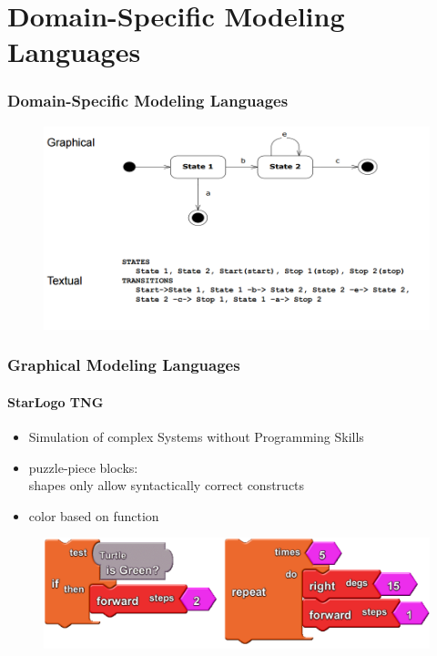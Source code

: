 \documentclass[11 pt,t]{beamer}
\begin{document}
\section{Domain-Specific Modeling Languages}

\begin{frame}
\vspace{.5cm}
  \frametitle{Domain-Specific Modeling Languages}
    \begin{figure}[H]
      \centering
      \includegraphics[width=\textwidth]{images/GraficalTextualComparison.PNG}
      \label{compare:textgraphiclang}
    \end{figure}
\end{frame}


\begin{frame}
\vspace{.5cm}
  \frametitle{Graphical Modeling Languages}
  \framesubtitle{StarLogo TNG}
  \begin{itemize}
   \item Simulation of complex Systems without Programming Skills
   \item puzzle-piece blocks: 
	\\shapes only allow syntactically correct constructs
   \item color based on function
  \end{itemize}
  
  \begin{figure}[hbtp]
	\centering
  \includegraphics[width=\textwidth]{images/StarLogoTNGBlocksEx.PNG}
	\label{fig1}
  \end{figure}
\end{frame}
\end{document}
